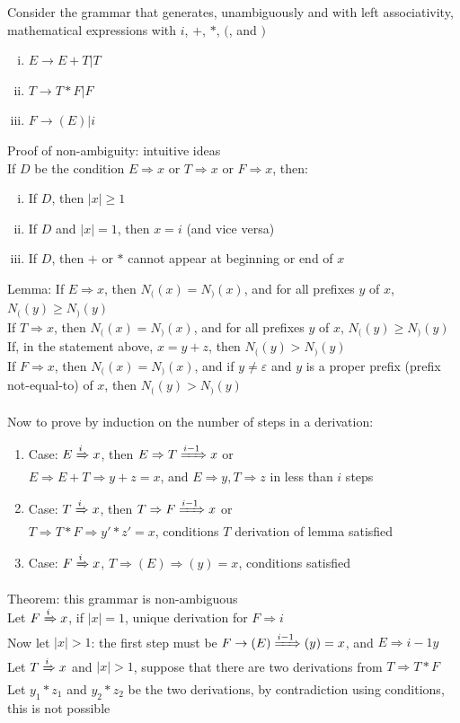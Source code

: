 \documentclass{article}
\newcommand*{\<}{\langle}
\renewcommand*{\>}{\rangle}
\begin{document}
			Consider the grammar that generates, unambiguously and with left associativity, mathematical expressions with $i$, $+$, $*$, $($, and $)$ 
			\begin{enumerate}[(i)]
				\item $E \to E + T | T$
				\item $T \to T * F | F$
				\item $F \to (E) | i$
				\end{enumerate}
			Proof of non-ambiguity: intuitive ideas \\
			If $D$ be the condition $E \Rightarrow x$ or $T \Rightarrow x$ or $F \Rightarrow x$, then:
			\begin{enumerate}[(i)]
				\item If $D$, then $|x| \geq 1$
				\item If $D$ and $|x| = 1$, then $x = i$ (and vice versa)
				\item If $D$, then $+$ or $*$ cannot appear at beginning or end of $x$
				\end{enumerate}
			Lemma: If $E \Rightarrow x$, then $N_((x) = N_)(x)$, and for all prefixes $y$ of $x$, $N_((y) \geq N_)(y)$ \\
			If $T \Rightarrow x$, then $N_((x) = N_)(x)$, and for all prefixes $y$ of $x$, $N_((y) \geq N_)(y)$ \\
			If, in the statement above, $x = y + z$, then $N_((y) > N_)(y)$ \\
			If $F \Rightarrow x$, then $N_((x) = N_)(x)$, and if $y \neq \varepsilon$ and $y$ is a proper prefix (prefix not-equal-to) of $x$, then $N_((y) > N_)(y)$ \\
			\\
			Now to prove by induction on the number of steps in a derivation: 
			\begin{enumerate}
				\item Case: $E \xRightarrow{i} x$, then $E \Rightarrow T \xRightarrow{i - 1} x$ or \\
				$E \Rightarrow E + T \Rightarrow y + z = x$, and $E \Rightarrow y, T \Rightarrow z$ in less than $i$ steps
				\item Case: $T \xRightarrow{i} x$, then $T \Rightarrow F \xRightarrow{i - 1} x$ or \\
				$T \Rightarrow T * F \Rightarrow y' * z' = x$, conditions $T$ derivation of lemma satisfied 
				\item Case: $F \xRightarrow{i} x$, $T \Rightarrow (E) \Rightarrow (y) = x$, conditions satisfied
			\end{enumerate}
			Theorem: this grammar is non-ambiguous \\
			Let $F \xRightarrow{i} x$, if $|x| = 1$, unique derivation for $F \Rightarrow i$ \\
			Now let $|x| > 1$: the first step must be $F \to (E) \xRightarrow{i - 1} (y) = x$, and $E \Rightarrow{i - 1} y$ \\
			Let $T \xRightarrow{i} x$ and $|x| > 1$, suppose that there are two derivations from $T \Rightarrow T * F$ \\
			Let $y_1 * z_1$ and $y_2 * z_2$ be the two derivations, by contradiction using conditions, this is not possible
\end{document}
